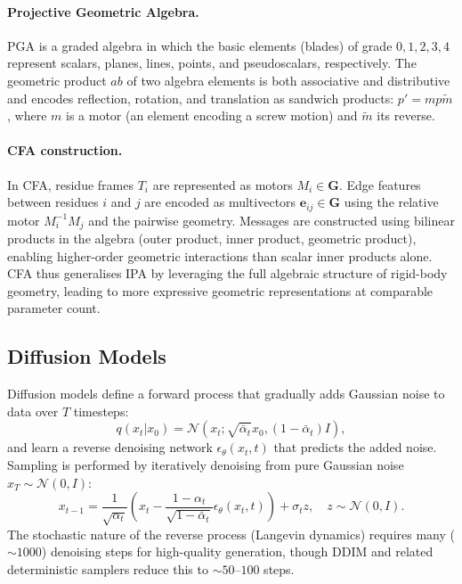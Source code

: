 \documentclass[12pt,a4paper]{article}
\begin{document}
\paragraph{Projective Geometric Algebra.}
PGA is a graded algebra in which the basic elements (blades) of grade $0, 1, 2, 3, 4$
represent scalars, planes, lines, points, and pseudoscalars, respectively.  The geometric
product $ab$ of two algebra elements is both associative and distributive and encodes
reflection, rotation, and translation as sandwich products: $p' = m p \tilde{m}$, where
$m$ is a motor (an element encoding a screw motion) and $\tilde{m}$ its reverse.

\paragraph{CFA construction.}
In CFA, residue frames $T_i$ are represented as motors $M_i \in \mathbf{G}$.  Edge features
between residues $i$ and $j$ are encoded as multivectors $\mathbf{e}_{ij} \in \mathbf{G}$
using the relative motor $M_i^{-1} M_j$ and the pairwise geometry.  Messages are constructed
using bilinear products in the algebra (outer product, inner product, geometric product),
enabling higher-order geometric interactions than scalar inner products alone.  CFA thus
generalises IPA by leveraging the full algebraic structure of rigid-body geometry, leading
to more expressive geometric representations at comparable parameter count.

\subsection{Diffusion Models}
\label{sec:diffusion}

Diffusion models \citep{song2021} define a forward process that gradually adds Gaussian noise
to data over $T$ timesteps:
\begin{equation}
  q(x_t | x_0) = \mathcal{N}(x_t; \sqrt{\bar{\alpha}_t} x_0, (1-\bar{\alpha}_t) I),
\end{equation}
and learn a reverse denoising network $\epsilon_\theta(x_t, t)$ that predicts the added noise.
Sampling is performed by iteratively denoising from pure Gaussian noise $x_T \sim \mathcal{N}(0,I)$:
\begin{equation}
  x_{t-1} = \frac{1}{\sqrt{\alpha_t}}\left(x_t - \frac{1-\alpha_t}{\sqrt{1-\bar{\alpha}_t}} \epsilon_\theta(x_t,t)\right) + \sigma_t z,
  \quad z \sim \mathcal{N}(0,I).
\end{equation}
The stochastic nature of the reverse process (Langevin dynamics) requires many ($\sim\!1000$)
denoising steps for high-quality generation, though DDIM \citep{song2021} and related
deterministic samplers reduce this to $\sim\!50$--$100$ steps.
\end{document}

